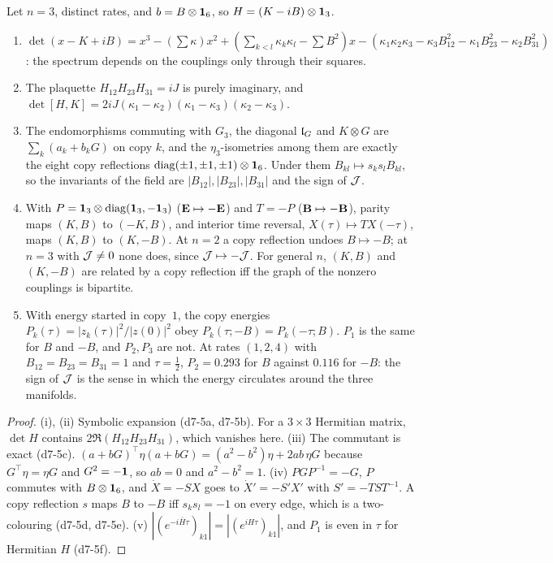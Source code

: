 \begin{theorem}
\label{d7:thm:three}
Let $n=3$, distinct rates, and $b=B\otimes\mathbf 1_6$, so $H=(K-iB)\otimes\mathbf 1_3$.
\begin{enumerate}[label=(\roman*),leftmargin=2.2em]
\item $\det(x-K+iB)=x^3-(\textstyle\sum\kappa)x^2+(\sum_{k<l}\kappa_k\kappa_l-\sum B^2)x-(\kappa_1\kappa_2\kappa_3-\kappa_3B_{12}^2-\kappa_1B_{23}^2-\kappa_2B_{31}^2)$: the spectrum
depends on the couplings only through their squares.
\item The plaquette $H_{12}H_{23}H_{31}=iJ$ is purely imaginary, and $\det[H,K]=2iJ(\kappa_1-\kappa_2)(\kappa_1-\kappa_3)(\kappa_2-\kappa_3)$.
\item The endomorphisms commuting with $G_3$, the diagonal $\mathfrak l_G$ and $K\otimes G$ are $\sum_k(a_k+b_kG)$ on copy $k$, and the $\eta_3$-isometries among them are
exactly the eight copy reflections $\operatorname{diag}(\pm1,\pm1,\pm1)\otimes\mathbf 1_6$. Under them $B_{kl}\mapsto s_ks_lB_{kl}$, so the invariants of the field
are $|B_{12}|,|B_{23}|,|B_{31}|$ and the sign of $\mathcal J $.
\item With $P=\mathbf 1_3\otimes\operatorname{diag}(\mathbf 1_3,-\mathbf 1_3)$ ($\mathbf E\mapsto-\mathbf E$) and $T=-P$ ($\mathbf B\mapsto-\mathbf B$), parity maps $(K,B)$ to $(-K,B)$, and interior
time reversal, $X(\tau)\mapsto TX(-\tau)$, maps $(K,B)$ to $(K,-B)$. At $n=2$ a copy reflection undoes $B\mapsto-B$; at $n=3$ with $\mathcal J \neq0$ none does, since
$\mathcal J \mapsto-\mathcal J $. For general $n$, $(K,B)$ and $(K,-B)$ are related by a copy reflection iff the graph of the nonzero couplings is bipartite.
\item With energy started in copy~$1$, the copy energies $P_k(\tau)=|z_k(\tau)|^2/|z(0)|^2$ obey $P_k(\tau;-B)=P_k(-\tau;B)$. $P_1$ is the same for $B$ and
$-B$, and $P_2,P_3$ are not. At rates $(1,2,4)$ with $B_{12}=B_{23}=B_{31}=1$ and $\tau=\tfrac12$, $P_2=0.293$ for $B$ against $0.116$ for $-B$: the sign
of $\mathcal J $ is the sense in which the energy circulates around the three manifolds.
\end{enumerate}
\end{theorem}

\begin{proof}
(i), (ii) Symbolic expansion (d7-5a, d7-5b). For a $3\times3$ Hermitian matrix, $\det H$ contains $2\Re(H_{12}H_{23}H_{31})$, which vanishes here.
(iii) The commutant is exact (d7-5c). $(a+bG)^{\!\top}\eta(a+bG)=(a^2-b^2)\eta+2ab\,\eta G$ because $G^{\!\top}\eta=\eta G$ and $G^2=-\mathbf 1$, so $ab=0$
and $a^2-b^2=1$. (iv) $PGP^{-1}=-G$, $P$ commutes with $B\otimes\mathbf 1_6$, and $\dot X=-SX$ goes to $\dot X'=-S'X'$ with $S'=-TST^{-1}$. A copy
reflection $s$ maps $B$ to $-B$ iff $s_ks_l=-1$ on every edge, which is a two-colouring (d7-5d, d7-5e). (v)
$|(e^{-i\bar H\tau})_{k1}|=|(e^{iH\tau})_{k1}|$, and $P_1$ is even in $\tau$ for Hermitian $H$ (d7-5f).
\end{proof}

